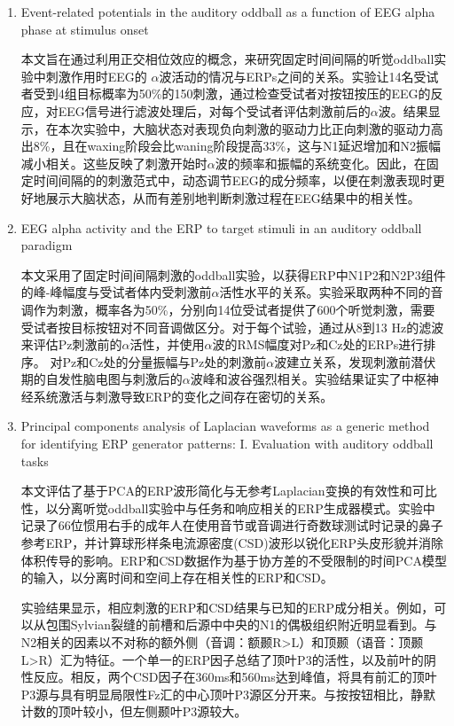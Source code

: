 \documentclass{hitreport}
\begin{document}
\begin{enumerate}
\item Event-related potentials in the auditory oddball as a function of EEG alpha phase at stimulus onset\cite{Barry2004}

\hspace{2em}本文旨在通过利用正交相位效应的概念，来研究固定时间间隔的听觉oddball实验中刺激作用时EEG的 $\alpha$波活动的情况与ERPs之间的关系。实验让14名受试者受到4组目标概率为50\%的150刺激，通过检查受试者对按钮按压的EEG的反应，对EEG信号进行滤波处理后，对每个受试者评估刺激前后的$\alpha$波。结果显示，在本次实验中，大脑状态对表现负向刺激的驱动力比正向刺激的驱动力高出8\%，且在waxing阶段会比waning阶段提高33\%，这与N1延迟增加和N2振幅减小相关。这些反映了刺激开始时$\alpha$波的频率和振幅的系统变化。因此，在固定时间间隔的的刺激范式中，动态调节EEG的成分频率，以便在刺激表现时更好地展示大脑状态，从而有差别地判断刺激过程在EEG结果中的相关性。

\item EEG alpha activity and the ERP to target stimuli in an auditory oddball paradigm\cite{Barry2000}

\hspace{2em}本文采用了固定时间间隔刺激的oddball实验，以获得ERP中N1P2和N2P3组件的峰-峰幅度与受试者体内受刺激前$\alpha$活性水平的关系。实验采取两种不同的音调作为刺激，概率各为50\%，分别向14位受试者提供了600个听觉刺激，需要受试者按目标按钮对不同音调做区分。对于每个试验，通过从8到13 Hz的滤波来评估Pz刺激前的$\alpha$活性，并使用$\alpha$波的RMS幅度对Pz和Cz处的ERPs进行排序。 对Pz和Cz处的分量振幅与Pz处的刺激前$\alpha$波建立关系，发现刺激前潜伏期的自发性脑电图与刺激后的$\alpha$波峰和波谷强烈相关。实验结果证实了中枢神经系统激活与刺激导致ERP的变化之间存在密切的关系。

\item Principal components analysis of Laplacian waveforms as a generic method for identifying ERP generator patterns: I. Evaluation with auditory oddball tasks\cite{Kayser2006}

\hspace{2em}本文评估了基于PCA的ERP波形简化与无参考Laplacian变换的有效性和可比性，以分离听觉oddball实验中与任务和响应相关的ERP生成器模式。实验中记录了66位惯用右手的成年人在使用音节或音调进行奇数球测试时记录的鼻子参考ERP，并计算球形样条电流源密度(CSD)波形以锐化ERP头皮形貌并消除体积传导的影响。ERP和CSD数据作为基于协方差的不受限制的时间PCA模型的输入，以分离时间和空间上存在相关性的ERP和CSD。

\hspace{2em}实验结果显示，相应刺激的ERP和CSD结果与已知的ERP成分相关。例如，可以从包围Sylvian裂缝的前槽和后源中中央的N1的偶极组织附近明显看到。与N2相关的因素以不对称的额外侧（音调：额颞R>L）和顶颞（语音：顶颞L>R）汇为特征。一个单一的ERP因子总结了顶叶P3的活性，以及前叶的阴性反应。相反，两个CSD因子在360ms和560ms达到峰值，将具有前汇的顶叶P3源与具有明显局限性Fz汇的中心顶叶P3源区分开来。与按按钮相比，静默计数的顶叶较小，但左侧颞叶P3源较大。


\end{enumerate}
\end{document}
